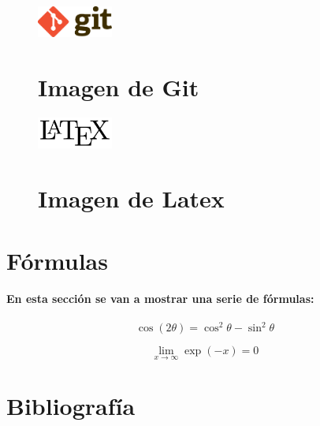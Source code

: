 \documentclass[a4paper,11pt]{article}
\begin{document}
\begin{figure} 
\centering
\includegraphics[width=25mm]{git.png}
\section{Imagen de Git}
\end{figure}


\begin{figure} 
\centering
\includegraphics[width=25mm]{LaTeX_logo.png}
\section{Imagen de Latex}
\end{figure}

\section*{Fórmulas}
\paragraph{En esta sección se van a mostrar una serie de fórmulas:}
$$\cos (2\theta)= \cos^2 \theta - \sin^2 \theta$$

$$\lim\limits_{x \to \infty} \exp(-x) = 0$$

\section*{Bibliografía}




\nocite{*}
\end{document}
